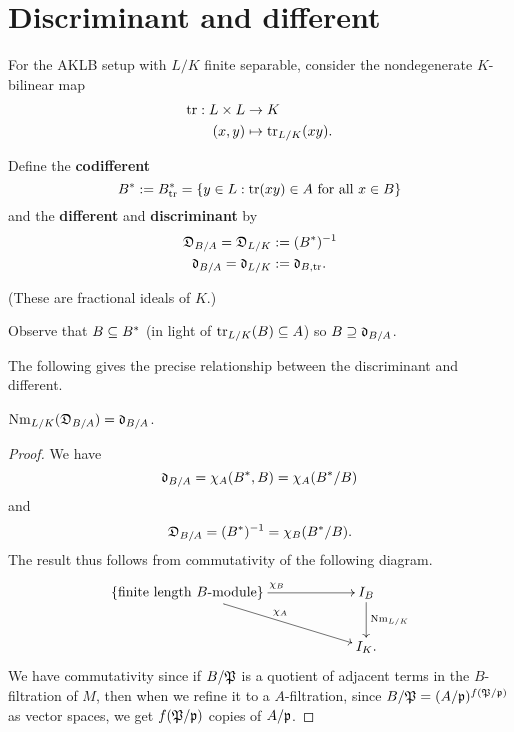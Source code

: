 \section{Discriminant and different}
For the AKLB setup with $L/K$ finite separable, consider the nondegenerate $K$-bilinear map
\begin{align*}
\operatorname{tr}:L\times L&\to K\\
(x,y)&\mapsto \operatorname{tr}_{L/K}(xy).
\end{align*}
\begin{df}
Define the \textbf{codifferent}
\[
B^*:=B_{\operatorname{tr}}^*=\left\{{y\in L}:{\operatorname{tr}(xy)\in A\text{ for all }x\in B}\right\}
\]
and the \textbf{different} and \textbf{discriminant} by
\begin{align*}
\mathfrak {\mathfrak D}_{B/A}=\mathfrak {\mathfrak D}_{L/K}&:=(B^*)^{-1}\\
\mathfrak d_{B/A}=\mathfrak d_{L/K}&:=\mathfrak d_{B,\operatorname{tr}}.
\end{align*}
\end{df}
(These are fractional ideals of $K$.)

Observe that $B\subseteq B^*$ (in light of $\operatorname{tr}_{L/K}(B)\subseteq A$) so $B\supseteq \mathfrak {\mathfrak d}_{B/A}$.

The following gives the precise relationship between the discriminant and different.
\begin{pr}
$\operatorname{Nm}_{L/K}(\mathfrak {\mathfrak D}_{B/A})=\mathfrak d_{B/A}$.
\end{pr}
\begin{proof}
We have
\[
\mathfrak d_{B/A}=\chi_A(B^*,B)=\chi_A(B^*/B)
\]
and
\[
\mathfrak D_{B/A} = (B^*)^{-1} = \chi_B(B^*/B).
\]
The result thus follows from commutativity of the following diagram.
\[
\xymatrixcolsep{5pc}
\xymatrix{
\{\text{finite length $B$-module}\}\ar[r]^{\chi_B} \ar[rd]^{\chi_A}&
I_B\ar[d]^{\nm_{L/K}}\\
&I_K.
}
\]
We have commutativity since if $B/\mathfrak{P}$ is a quotient of adjacent terms in the $B$-filtration of $M$, then when we refine it to a $A$-filtration, since $B/\mathfrak{P}=(A/\mathfrak{p})^{f(\mathfrak{P}/\mathfrak{p})}$ as vector spaces, we get $f(\mathfrak{P}/\mathfrak{p})$ copies of $A/\mathfrak{p}$.
\end{proof}
